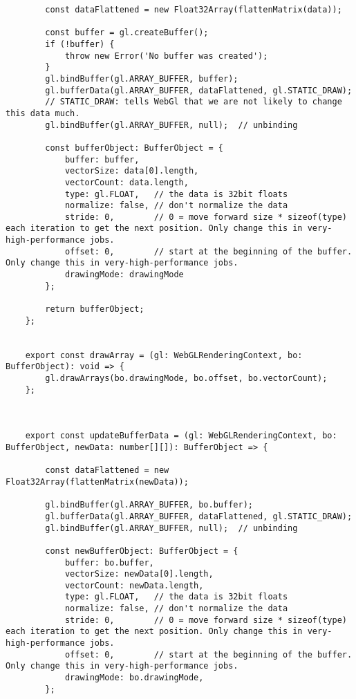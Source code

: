 \begin{lstlisting}
        const dataFlattened = new Float32Array(flattenMatrix(data));
    
        const buffer = gl.createBuffer();
        if (!buffer) {
            throw new Error('No buffer was created');
        }
        gl.bindBuffer(gl.ARRAY_BUFFER, buffer);
        gl.bufferData(gl.ARRAY_BUFFER, dataFlattened, gl.STATIC_DRAW);
        // STATIC_DRAW: tells WebGl that we are not likely to change this data much.
        gl.bindBuffer(gl.ARRAY_BUFFER, null);  // unbinding
    
        const bufferObject: BufferObject = {
            buffer: buffer,
            vectorSize: data[0].length,
            vectorCount: data.length,
            type: gl.FLOAT,   // the data is 32bit floats
            normalize: false, // don't normalize the data
            stride: 0,        // 0 = move forward size * sizeof(type) each iteration to get the next position. Only change this in very-high-performance jobs.
            offset: 0,        // start at the beginning of the buffer. Only change this in very-high-performance jobs.
            drawingMode: drawingMode
        };
    
        return bufferObject;
    };
    
    
    export const drawArray = (gl: WebGLRenderingContext, bo: BufferObject): void => {
        gl.drawArrays(bo.drawingMode, bo.offset, bo.vectorCount);
    };
    
    
    
    export const updateBufferData = (gl: WebGLRenderingContext, bo: BufferObject, newData: number[][]): BufferObject => {
    
        const dataFlattened = new Float32Array(flattenMatrix(newData));
    
        gl.bindBuffer(gl.ARRAY_BUFFER, bo.buffer);
        gl.bufferData(gl.ARRAY_BUFFER, dataFlattened, gl.STATIC_DRAW);
        gl.bindBuffer(gl.ARRAY_BUFFER, null);  // unbinding
    
        const newBufferObject: BufferObject = {
            buffer: bo.buffer,
            vectorSize: newData[0].length,
            vectorCount: newData.length,
            type: gl.FLOAT,   // the data is 32bit floats
            normalize: false, // don't normalize the data
            stride: 0,        // 0 = move forward size * sizeof(type) each iteration to get the next position. Only change this in very-high-performance jobs.
            offset: 0,        // start at the beginning of the buffer. Only change this in very-high-performance jobs.
            drawingMode: bo.drawingMode,
        };
    

\end{lstlisting}
